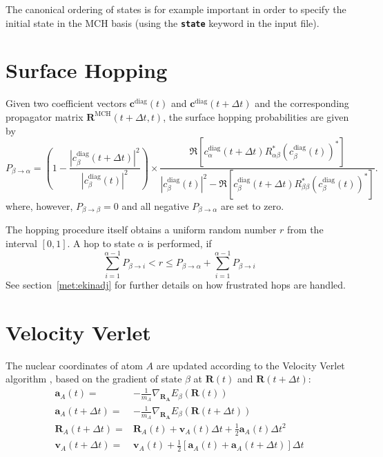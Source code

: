 \documentclass[a4paper,11pt,DIV=15,openany,twoside=false]{scrbook}
\newcommand{\ttt}[1]{\textbf{\texttt{#1}}}
\newcommand{\VEC}[1]{\ensuremath{\mathbf{#1}}}
\begin{document}
The canonical ordering of states is for example important in order to specify the initial state in the MCH basis (using the \ttt{state} keyword in the input file).


\section{Surface Hopping}

Given two coefficient vectors $\VEC{c}^{\text{diag}}(t)$ and $\VEC{c}^{\text{diag}}(t+\Delta t)$ and the corresponding propagator matrix $\VEC{R}^{\text{MCH}}(t+\Delta t,t)$, the surface hopping probabilities are given by
\begin{equation}
  P_{\beta\rightarrow\alpha}=
  \left(
    1-
    \frac{
      \left|
        c_\beta^{\text{diag}}(t+\Delta t)
      \right|^2
    }{
      \left|
        c_\beta^{\text{diag}}(t)
      \right|^2
    }\right)
    \times
    \frac{
      \Re\left[
        c^{\text{diag}}_\alpha(t+\Delta t)
        R^*_{\alpha\beta}
        \left(
          c^{\text{diag}}_\beta(t)
        \right)^*
      \right]
    }{
      \left|
        c^{\text{diag}}_\beta(t)
      \right|^2
      -\Re\left[
        c^{\text{diag}}_\beta(t+\Delta t)
        R^*_{\beta\beta}
        \left(
          c^{\text{diag}}_\beta(t)
        \right)^*
      \right]
    }.
\end{equation}
where, however, $P_{\beta\rightarrow\beta}=0$ and all negative $P_{\beta\rightarrow\alpha}$ are set to zero.

The hopping procedure itself obtains a uniform random number $r$ from the interval $[0,1]$. A hop to state $\alpha$ is performed, if
\begin{equation}
  \sum\limits_{i=1}^{\alpha-1} P_{\beta\rightarrow i} < r \le P_{\beta\rightarrow\alpha}+\sum\limits_{i=1}^{\alpha-1} P_{\beta\rightarrow i}
\end{equation}
See section~\ref{met:ekinadj} for further details on how frustrated hops are handled.


\section{Velocity Verlet}

The nuclear coordinates of atom $A$ are updated according to the Velocity Verlet algorithm \cite{Verlet1967PR}, based on the gradient of state $\beta$ at $\VEC{R}(t)$ and $\VEC{R}(t+\Delta t)$:
\begin{align}
  \VEC{a}_A(t)=&
  -\frac{1}{m_A}\nabla_{\VEC{R_A}}E_\beta(\VEC{R}(t))\\
  \VEC{a}_A(t+\Delta t)=&
  -\frac{1}{m_A}\nabla_{\VEC{R_A}}E_\beta(\VEC{R}(t+\Delta t))\\
  \VEC{R}_A(t+\Delta t)=&
  \VEC{R}_A(t)+\VEC{v}_A(t)\Delta t + \frac{1}{2}\VEC{a}_A(t)\Delta t^2\\
  \VEC{v}_A(t+\Delta t)=&
  \VEC{v}_A(t)+\frac{1}{2}\left[\VEC{a}_A(t)+\VEC{a}_A(t+\Delta t)\right]\Delta t
\end{align}
\end{document}
